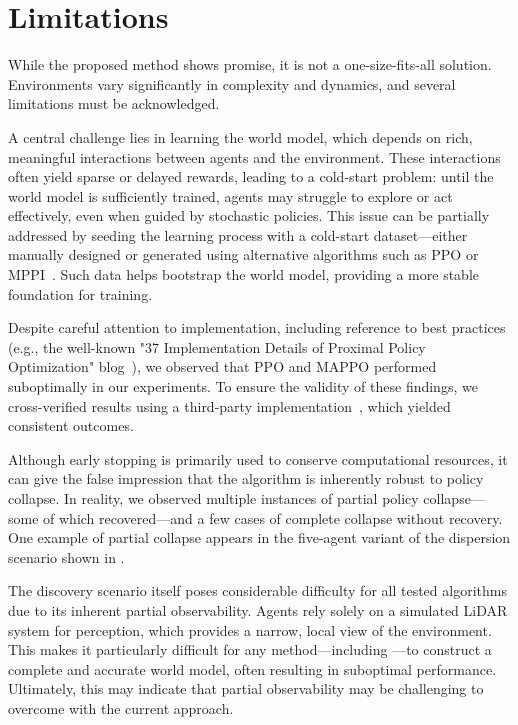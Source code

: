 \section{Limitations}

While the proposed method shows promise, it is not a one-size-fits-all solution. Environments vary significantly in complexity and dynamics, and several limitations must be acknowledged.

A central challenge lies in learning the world model, which depends on rich, meaningful interactions between agents and the environment. These interactions often yield sparse or delayed rewards, leading to a cold-start problem: until the world model is sufficiently trained, agents may struggle to explore or act effectively, even when guided by stochastic policies. This issue can be partially addressed by seeding the learning process with a cold-start dataset—either manually designed or generated using alternative algorithms such as PPO or MPPI~\cite{Alvarez24}. Such data helps bootstrap the world model, providing a more stable foundation for training.

Despite careful attention to implementation, including reference to best practices (e.g., the well-known "37 Implementation Details of Proximal Policy Optimization" blog~\cite{Shengyi22}), we observed that PPO and MAPPO performed suboptimally in our experiments. To ensure the validity of these findings, we cross-verified results using a third-party implementation~\cite{Bettini24}, which yielded consistent outcomes.

Although early stopping is primarily used to conserve computational resources, it can give the false impression that the algorithm is inherently robust to policy collapse. In reality, we observed multiple instances of partial policy collapse—some of which recovered—and a few cases of complete collapse without recovery. One example of partial collapse appears in the five-agent variant of the dispersion scenario shown in .

The discovery scenario itself poses considerable difficulty for all tested algorithms due to its inherent partial observability. Agents rely solely on a simulated LiDAR system for perception, which provides a narrow, local view of the environment. This makes it particularly difficult for any method—including \fname{}—to construct a complete and accurate world model, often resulting in suboptimal performance. Ultimately, this may indicate that partial observability may be challenging to overcome with the current approach.

